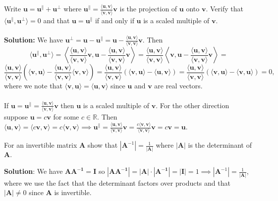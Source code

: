 \documentclass{harvardml}
\theoremstyle{definition}
\theoremstyle{plain}
\newcommand{\R}{\mathbb{R}}
\renewcommand{\v}[1]{\mathbf{#1}}
\begin{document}
\begin{problem}
        Write $\mathbf{u} = \mathbf{u}^\parallel + \mathbf{u^\perp}$ where $\mathbf{u}^\parallel = \frac{\langle \v u, \v v \rangle}
				{\langle \v v, \v v \rangle} \v v$ is the projection of $\v u$ onto $\v v$. Verify that $\langle \mathbf{u}^\parallel,
		\mathbf{u^\perp} \rangle = 0$ and that $\v u = \mathbf{u}^\parallel$ if and only if $\v u$ is a scaled multiple of $\v v$.
		\\ 
		\\
		\textbf{Solution:} We have $\mathbf{u}^\perp = \v u - \mathbf{u}^\parallel = \v u - \frac{\langle \v u, \v v \rangle}
				{\langle \v v, \v v \rangle} \v v.$ Then
				$$
				\langle \mathbf{u}^\parallel, \v u^\perp\rangle = \left\langle \frac{\langle \v u, \v v \rangle}
				{\langle \v v, \v v \rangle} \v v, \v u - \frac{\langle \v u, \v v \rangle}
				{\langle \v v, \v v \rangle} \v v \right\rangle = \frac{\langle \v u, \v v \rangle}
				{\langle \v v, \v v \rangle}\left\langle \v v, \v u - \frac{\langle \v u, \v v \rangle}
				{\langle \v v, \v v \rangle} \v v \right\rangle = $$ $$
				\frac{\langle \v u, \v v \rangle}
				{\langle \v v, \v v \rangle}\left(\langle \v v, \v u \rangle - \frac{\langle \v u, \v v \rangle}
				{\langle \v v, \v v \rangle}\langle \v v, \v v \rangle\right) = \frac{\langle \v u, \v v \rangle}
				{\langle \v v, \v v \rangle}(\langle \v v, \v u \rangle - \langle \v u, \v v \rangle) = \frac{\langle \v u, \v v \rangle}
				{\langle \v v, \v v \rangle}(\langle \v v, \v u \rangle - \langle \v v, \v u \rangle) = 0
				,$$
				where we note that $\langle \v v, \v u \rangle = \langle \v u, \v v\rangle$ since $\v u$ and $\v v$ are real vectors.\\
				\\
				If $\v u = \mathbf{u}^\parallel = \frac{\langle \v u, \v v \rangle}
				{\langle \v v, \v v \rangle}\v v$ then $\v u$ is a scaled multiple of $\v v$. For the other direction suppose $\v u = c \v v$ for some $c \in \R$. Then $\langle \v u, \v v \rangle = \langle c \v v, \v v \rangle = c \langle \v v, \v v \rangle \implies \mathbf{u}^\parallel = \frac{\langle \v u, \v v \rangle}{\langle \v v, \v v \rangle} \v v = \frac{c\langle \v v, \v v \rangle}{\langle \v v, \v v \rangle} \v v = c\v v = \v u. $
        \end{problem}


\begin{problem}
                For an invertible matrix $\mathbf{A}$ show that $|\mathbf{A}^{-1}| = \frac{1}{|\mathbf A|}$ where $|\mathbf A|$ is the determinant of $\mathbf{A}.$
                \\
                \\
                \textbf{Solution}: We have $\mathbf{AA^{-1}} = \mathbf I$ so $|\mathbf{AA^{-1}}| = |\mathbf A| \cdot |\mathbf{A^{-1}}| = |\mathbf{I}| = 1 \implies |\mathbf{A}^{-1}| = \frac{1}{|\mathbf A|}$, where we use the fact that the determinant factors over products and that $|\mathbf A| \neq 0$ since $\mathbf A$ is invertible.
\end{problem}
        
\end{document}
